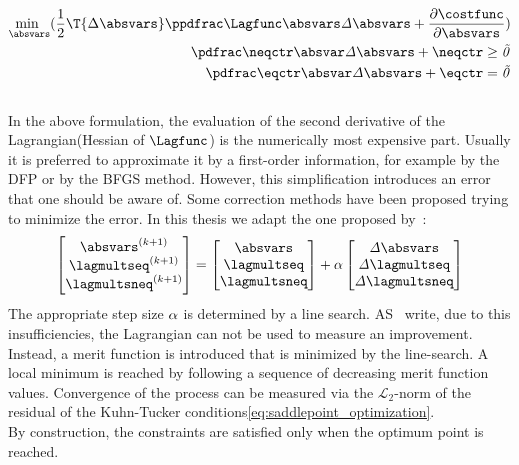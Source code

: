 \documentclass[../main.tex]{subfiles}
\begin{document}
\begin{align}
\underset{\absvars}{\text{min }}( \frac{1}{2} \T{\incrabsvars} \it{\PPLagfuncBYabsvars} \incrabsvars + \frac{\partial \it{\costfunc}}{\partial \absvars} ) \nonumber \label{eq:quadratic_minimization_problem_1}\\
\it{\PneqctrBYabsvars} \incrabsvars+\it{\neqctr} \geq \vec{0} \label{eq:quadratic_minimization_problem_2}\nonumber\\
\it{\PeqctrBYabsvars} \incrabsvars+\it{\eqctr} = \vec{0} \label{eq:quadratic_minimization_problem_3}
\end{align}
\\
In the above formulation, the evaluation of the second derivative of the Lagrangian(Hessian of $\Lagfunc$) is the numerically most expensive part. Usually it is preferred to approximate it by a first-order information, for example by the \ac{DFP} or by the \ac{BFGS} method. However, this simplification introduces an error that one should be aware of. Some correction methods have been proposed trying to minimize the error. In this thesis we adapt the one proposed by~\cite{Maute2001}:
\begin{align}\label{eq:correction_step}
\begin{bmatrix}
\absvars^{(k+1)} \\
\lagmultseq^{(k+1)} \\
\lagmultsneq^{(k+1)}
\end{bmatrix} =
  \begin{bmatrix}
  \it{\absvars} \\
  \it{\lagmultseq} \\
  \it{\lagmultsneq} \\
  \end{bmatrix} +
    \it{\alpha}
    \begin{bmatrix}
    \it{\incrabsvars} \\
    \it{\incrlagmultseq} \\
    \it{\incrlagmultsneq} \\
    \end{bmatrix}
\end{align}
The appropriate step size $\it{\alpha}$ is determined by a line search. AS~\cite{Maute2001} write, due to this insufficiencies, the Lagrangian can not be used to measure an improvement. Instead, a merit function is introduced that is minimized by the line-search. A local minimum is reached by following a sequence of decreasing merit function values. Convergence of the process can be measured via the $\mathcal{L}_2$-norm of the residual of the Kuhn-Tucker conditions\eqref{eq:saddlepoint_optimization}.\\
By construction, the constraints are satisfied only when the optimum point is reached.
\end{document}
